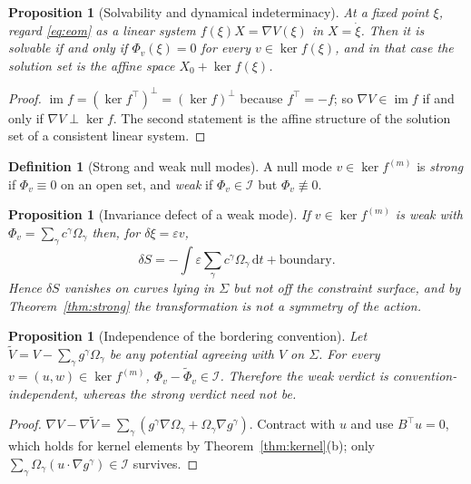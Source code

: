 \documentclass[12pt]{article}
\theoremstyle{plain}
\newtheorem{proposition}[theorem]{Proposition}
\theoremstyle{definition}
\newtheorem{definition}[theorem]{Definition}
\theoremstyle{remark}
\DeclareMathOperator{\im}{im}
\newcommand{\dd}{\mathrm{d}}
\newcommand{\Om}{\Omega}
\newcommand{\Ical}{\mathcal{I}}
\begin{document}
	\begin{proposition}[Solvability and dynamical indeterminacy]
		\label{prop:solv}
		At a fixed point $\xi$, regard \eqref{eq:eom} as a linear system
		$f(\xi)X=\nabla V(\xi)$ in $X=\dot\xi$. Then it is solvable if and only if
		$\Phi_{v}(\xi)=0$ for every $v\in\ker f(\xi)$, and in that case the solution set
		is the affine space $X_{0}+\ker f(\xi)$.
	\end{proposition}
	
	\begin{proof}
		$\im f=(\ker f^{\top})^{\perp}=(\ker f)^{\perp}$ because $f^{\top}=-f$; so
		$\nabla V\in\im f$ if and only if $\nabla V\perp\ker f$. The second statement is
		the affine structure of the solution set of a consistent linear system.
	\end{proof}
	
	\begin{definition}[Strong and weak null modes]
		\label{def:strongweak}
		A null mode $v\in\ker f^{(m)}$ is \emph{strong} if $\Phi_{v}\equiv0$ on an open
		set, and \emph{weak} if $\Phi_{v}\in\Ical$ but $\Phi_{v}\not\equiv0$.
	\end{definition}
	
	\begin{proposition}[Invariance defect of a weak mode]
		\label{prop:defect}
		If $v\in\ker f^{(m)}$ is weak with $\Phi_{v}=\sum_{\gamma}c^{\gamma}\Om_{\gamma}$
		then, for $\delta\xi=\varepsilon v$,
		\begin{equation}
			\delta S=-\int\varepsilon\sum_{\gamma}c^{\gamma}\Om_{\gamma}\,\dd t
			+\text{boundary}.
			\label{eq:defect}
		\end{equation}
		Hence $\delta S$ vanishes on curves lying in $\Sigma$ but not off the constraint
		surface, and by Theorem~\ref{thm:strong} the transformation is not a symmetry of
		the action.
	\end{proposition}
	
	\begin{proposition}[Independence of the bordering convention]
		\label{prop:convention}
		Let $\widetilde V=V-\sum_{\gamma}g^{\gamma}\Om_{\gamma}$ be any potential
		agreeing with $V$ on $\Sigma$. For every $v=(u,w)\in\ker f^{(m)}$,
		$\Phi_{v}-\widetilde\Phi_{v}\in\Ical$. Therefore the weak verdict is
		convention-independent, whereas the strong verdict need not be.
	\end{proposition}
	
	\begin{proof}
		$\nabla V-\nabla\widetilde V
		=\sum_{\gamma}(g^{\gamma}\nabla\Om_{\gamma}+\Om_{\gamma}\nabla g^{\gamma})$.
		Contract with $u$ and use $B^{\top}u=0$, which holds for kernel elements by
		Theorem~\ref{thm:kernel}(b); only
		$\sum_{\gamma}\Om_{\gamma}(u\cdot\nabla g^{\gamma})\in\Ical$ survives.
	\end{proof}
	
\end{document}
